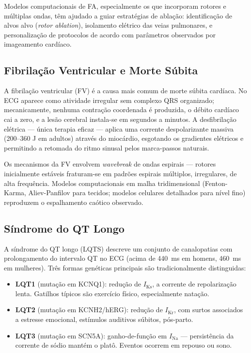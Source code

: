 Modelos computacionais de FA, especialmente os que incorporam rotores
e múltiplas ondas, têm ajudado a guiar estratégias de ablação:
identificação de alvos alvo (\emph{rotor ablation}), isolamento elétrico
das veias pulmonares, e personalização de protocolos de acordo com
parâmetros observados por imageamento cardíaco.

\subsection{Fibrilação Ventricular e Morte Súbita}
\label{sub:image12-fv}

A fibrilação ventricular (FV) é a causa mais comum de morte súbita
cardíaca. No ECG aparece como atividade irregular sem complexo QRS
organizado; mecanicamente, nenhuma contração coordenada é produzida, o
débito cardíaco cai a zero, e a lesão cerebral instala-se em segundos
a minutos. A desfibrilação elétrica --- única terapia eficaz ---
aplica uma corrente despolarizante massiva (200--360 J em adultos)
através do miocárdio, esgotando os gradientes elétricos e permitindo a
retomada do ritmo sinusal pelos marca-passos naturais.

Os mecanismos da FV envolvem \emph{wavebreak} de ondas espirais --- rotores
inicialmente estáveis fraturam-se em padrões espirais múltiplos,
irregulares, de alta frequência. Modelos computacionais em malha
tridimensional (Fenton-Karma, Aliev-Panfilov para tecidos; modelos celulares
detalhados para nível fino) reproduzem o espalhamento caótico observado.

\subsection{Síndrome do QT Longo}
\label{sub:image12-lqts}

A síndrome do QT longo (LQTS) descreve um conjunto de canalopatias com
prolongamento do intervalo QT no ECG (acima de 440~ms em homens, 460~ms
em mulheres). Três formas genéticas principais são tradicionalmente
distinguidas:

\begin{itemize}
\item \textbf{LQT1} (mutação em KCNQ1): redução de $I_{\mathrm{Ks}}$, a corrente
  de repolarização lenta. Gatilhos típicos são exercício físico,
  especialmente natação.
\item \textbf{LQT2} (mutação em KCNH2/hERG): redução de $I_{\mathrm{Kr}}$, com
  surtos associados a estresse emocional, estímulos auditivos súbitos,
  pós-parto.
\item \textbf{LQT3} (mutação em SCN5A): ganho-de-função em $I_{\mathrm{Na}}$ ---
  persistência da corrente de sódio mantém o platô. Eventos ocorrem em
  repouso ou sono.
\end{itemize}

